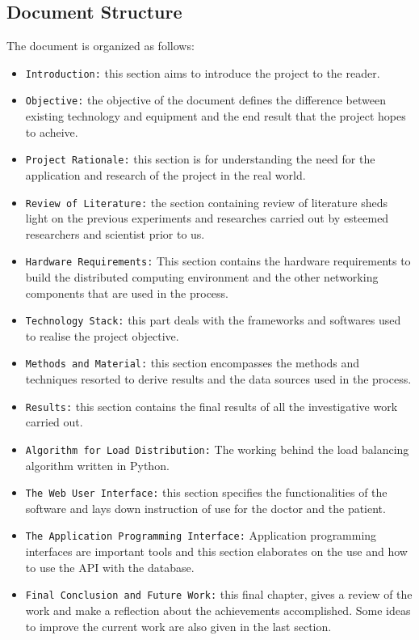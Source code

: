 \documentclass[12pt]{article}
\begin{document}
\subsection{Document Structure}
The document is organized as follows:
\begin{itemize}
\item \texttt{Introduction:} this section aims to introduce the project to the reader.
\item \texttt{Objective:} the objective of the document defines the difference between existing technology and equipment and the end result that the project hopes to acheive.
\item \texttt{Project Rationale:} this section is for understanding the need for the application and research of the project in the real world.
\item \texttt{Review of Literature:} the section containing review of literature sheds light on the previous experiments and researches carried out by esteemed researchers and scientist prior to us.
\item \texttt{Hardware Requirements:} This section contains the hardware requirements to build the distributed computing environment and the other networking components that are used in the process.
\item \texttt{Technology Stack:} this part deals with the frameworks and softwares used to realise the project objective.
\item \texttt{Methods and Material:} this section encompasses the methods and techniques resorted to derive results and the data sources used in the process.
\item \texttt{Results:} this section contains the final results of all the investigative work carried out.
\item \texttt{Algorithm for Load Distribution:} The working behind the load balancing algorithm written in Python.
\item \texttt{The Web User Interface:} this section specifies the functionalities of the software and lays down instruction of use for the doctor and the patient.
\item \texttt{The Application Programming Interface:} Application programming interfaces are important tools and this section elaborates on the use and how to use the API with the database.
\item \texttt{Final Conclusion and Future Work:} this final chapter, gives a review of the work and make a reflection about the achievements accomplished. Some ideas to improve the current work are also given in the last section.

\end{itemize}
\end{document}
